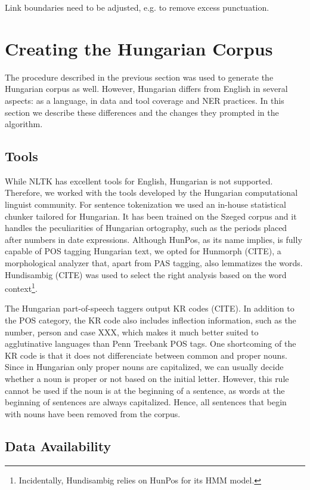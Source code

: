 \documentclass[11pt]{article}
\begin{document}
Link boundaries need to be adjusted, e.g. to remove excess punctuation.

\section{Creating the Hungarian Corpus}
\label{sec:hun}

The procedure described in the previous section was used to generate the Hungarian corpus as well. However, Hungarian differs from English in several aspects: as a language, in data and tool coverage and NER practices. In this section we describe these differences and the changes they prompted in the algorithm.

\subsection{Tools}

While NLTK has excellent tools for English, Hungarian is not supported. Therefore, we worked with the tools developed by the Hungarian computational linguist community. For sentence tokenization we used an in-house statistical chunker tailored for Hungarian. It has been trained on the Szeged corpus and it handles the peculiarities of Hungarian ortography, such as the periods placed after numbers in date expressions. Although HunPos, as its name implies, is fully capable of POS tagging Hungarian text, we opted for Hunmorph (CITE), a morphological analyzer that, apart from PAS tagging, also lemmatizes the words. Hundisambig (CITE) was used to select the right analysis based on the word context\footnote{Incidentally, Hundisambig relies on HunPos for its HMM model.}.

The Hungarian part-of-speech taggers output KR codes (CITE). In addition to the POS category, the KR code also includes inflection information, such as the number, person and case XXX, which makes it much better suited to agglutinative languages than Penn Treebank POS tags. One shortcoming of the KR code is that it does not differenciate between common and proper nouns. Since in Hungarian only proper nouns are capitalized, we can usually decide whether a noun is proper or not based on the initial letter. However, this rule cannot be used if the noun is at the beginning of a sentence, as words at the beginning of sentences are always capitalized. Hence, all sentences that begin with nouns have been removed from the corpus.

\subsection{Data Availability}
\end{document}
